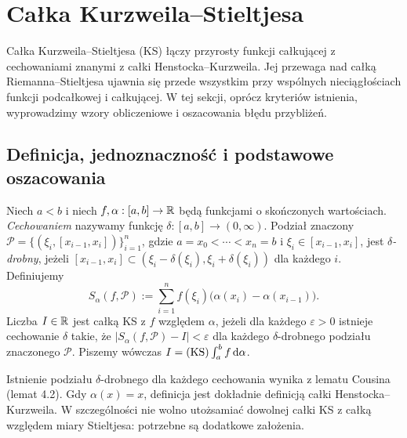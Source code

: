 \section{Całka Kurzweila--Stieltjesa}
\label{sec:kurzweil-stieltjes}
Całka Kurzweila--Stieltjesa (KS) łączy przyrosty funkcji całkującej z cechowaniami znanymi z całki Henstocka--Kurzweila. Jej przewaga nad całką Riemanna--Stieltjesa ujawnia się przede wszystkim przy wspólnych nieciągłościach funkcji podcałkowej i całkującej. W tej sekcji, oprócz kryteriów istnienia, wyprowadzimy wzory obliczeniowe i oszacowania błędu przybliżeń.

\subsection*{Definicja, jednoznaczność i podstawowe oszacowania}
\begin{definicja}
Niech $a<b$ i niech $f,\alpha:[a,b]\to\mathbb R$ będą funkcjami o skończonych wartościach. \emph{Cechowaniem} nazywamy funkcję $\delta:[a,b]\to(0,\infty)$. Podział znaczony $\mathcal P=\{(\xi_i,[x_{i-1},x_i])\}_{i=1}^n$, gdzie $a=x_0<\cdots<x_n=b$ i $\xi_i\in[x_{i-1},x_i]$, jest \emph{$\delta$-drobny}, jeżeli $[x_{i-1},x_i]\subset(\xi_i-\delta(\xi_i),\xi_i+\delta(\xi_i))$ dla każdego $i$. Definiujemy
\[
 S_\alpha(f,\mathcal P):=\sum_{i=1}^n f(\xi_i)\bigl(\alpha(x_i)-\alpha(x_{i-1})\bigr).
\]
Liczba $I\in\mathbb R$ jest całką KS z $f$ względem $\alpha$, jeżeli dla każdego $\varepsilon>0$ istnieje cechowanie $\delta$ takie, że $|S_\alpha(f,\mathcal P)-I|<\varepsilon$ dla każdego $\delta$-drobnego podziału znaczonego $\mathcal P$. Piszemy wówczas $I=(\mathrm{KS})\int_a^b f\,\mathrm d\alpha$.
\end{definicja}
Istnienie podziału $\delta$-drobnego dla każdego cechowania wynika z lematu Cousina (lemat 4.2). Gdy $\alpha(x)=x$, definicja jest dokładnie definicją całki Henstocka--Kurzweila. W szczególności nie wolno utożsamiać dowolnej całki KS z całką względem miary Stieltjesa: potrzebne są dodatkowe założenia.

